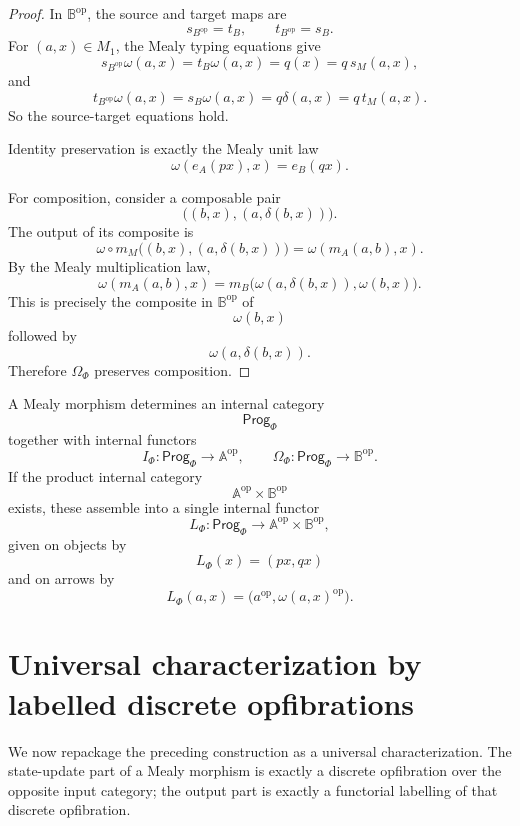 \begin{proof}
In \(\mathbb B^{\mathrm{op}}\), the source and target maps are
\[
s_{B^{\mathrm{op}}}=t_B,
\qquad
t_{B^{\mathrm{op}}}=s_B.
\]
For \((a,x)\in M_1\), the Mealy typing equations give
\[
s_{B^{\mathrm{op}}}\omega(a,x)
=
t_B\omega(a,x)
=
q(x)
=
q\,s_M(a,x),
\]
and
\[
t_{B^{\mathrm{op}}}\omega(a,x)
=
s_B\omega(a,x)
=
q\delta(a,x)
=
q\,t_M(a,x).
\]
So the source-target equations hold.

Identity preservation is exactly the Mealy unit law
\[
\omega(e_A(px),x)=e_B(qx).
\]

For composition, consider a composable pair
\[
\bigl((b,x),(a,\delta(b,x))\bigr).
\]
The output of its composite is
\[
\omega\circ m_M\bigl((b,x),(a,\delta(b,x))\bigr)
=
\omega(m_A(a,b),x).
\]
By the Mealy multiplication law,
\[
\omega(m_A(a,b),x)
=
m_B\bigl(\omega(a,\delta(b,x)),\omega(b,x)\bigr).
\]
This is precisely the composite in \(\mathbb B^{\mathrm{op}}\) of
\[
\omega(b,x)
\]
followed by
\[
\omega(a,\delta(b,x)).
\]
Therefore \(\Omega_\Phi\) preserves composition.
\end{proof}

\begin{corollary}
\label{cor:labelled-mealy-program-category}
A Mealy morphism determines an internal category
\[
\mathsf{Prog}_\Phi
\]
together with internal functors
\[
I_\Phi:\mathsf{Prog}_\Phi\to\mathbb A^{\mathrm{op}},
\qquad
\Omega_\Phi:\mathsf{Prog}_\Phi\to\mathbb B^{\mathrm{op}}.
\]
If the product internal category
\[
\mathbb A^{\mathrm{op}}\times\mathbb B^{\mathrm{op}}
\]
exists, these assemble into a single internal functor
\[
L_\Phi:
\mathsf{Prog}_\Phi
\longrightarrow
\mathbb A^{\mathrm{op}}\times\mathbb B^{\mathrm{op}},
\]
given on objects by
\[
L_\Phi(x)=(p x,q x)
\]
and on arrows by
\[
L_\Phi(a,x)=\bigl(a^{\mathrm{op}},\omega(a,x)^{\mathrm{op}}\bigr).
\]
\end{corollary}

\section{Universal characterization by labelled discrete opfibrations}
\label{sec:universal-labelled-discrete-opfibrations}

We now repackage the preceding construction as a universal characterization. The state-update part of a Mealy morphism is exactly a discrete opfibration over the opposite input category; the output part is exactly a functorial labelling of that discrete opfibration.

